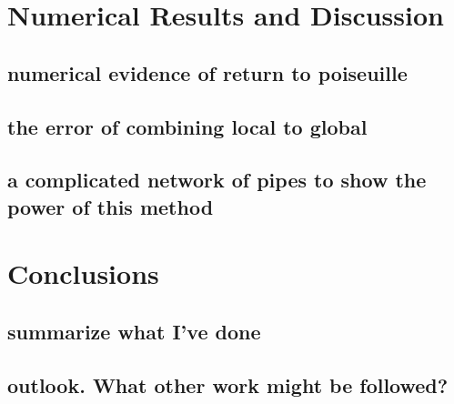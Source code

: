 \documentclass[10pt,twocolumn]{article}
\begin{document}
\section{Numerical Results and Discussion\label{sec:numericalresults}}

\subsection{numerical evidence of return to poiseuille}
\subsection{the error of combining local to global}
\subsection{a complicated network of pipes to show the power of this method}

\section{Conclusions\label{sec:conclusions}}

\subsection{summarize what I've done}
\subsection{outlook. What other work might be followed?}


\end{document}

